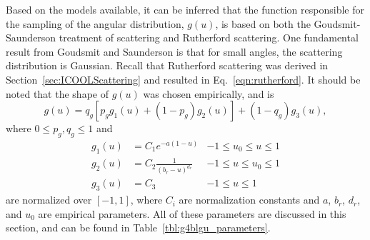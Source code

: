 Based on the models available, it can be inferred that the function responsible for the sampling of the angular distribution, $g(u)$, is based on both the Goudsmit-Saunderson treatment of scattering \cite{gs} and Rutherford scattering. One fundamental result from Goudsmit and Saunderson is that for small angles, the scattering distribution is Gaussian. Recall that Rutherford scattering was derived in Section~\ref{sec:ICOOLScattering} and resulted in Eq.~\eqref{eqn:rutherford}. It should be noted that the shape of $g(u)$ was chosen empirically, and is
%
\begin{equation}\label{eqn:g4blgu}
g(u)=q_g\left[p_g g_1(u)+(1-p_g)g_2(u)\right]+(1-q_g)g_3(u),
\end{equation}
%
where $0\leq p_g,q_g\leq 1$ and
%
\begin{align*}\nonumber
g_1(u)&=C_1e^{-a(1-u)} & -1\le u_0\le u\le 1\\
g_2(u)&=C_2\frac{1}{(b_r-u)^{d_r}} & -1\le u\le u_0\le 1\\
g_3(u)&=C_3 & -1\le u \le 1
\end{align*}
%
are normalized over $[-1,1]$, where $C_i$ are normalization constants and $a$, $b_r$, $d_r$, and $u_0$ are empirical parameters. All of these parameters are discussed in this section, and can be found in Table~\ref{tbl:g4blgu_parameters}. 

